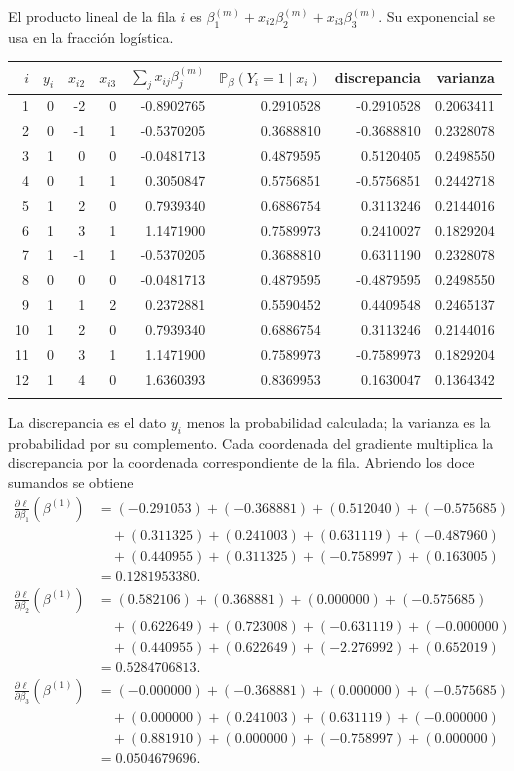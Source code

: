 \documentclass[11pt,a4paper]{article}
\newcommand{\Prob}{\mathbb P}
\begin{document}
El producto lineal de la fila \(i\) es
\(\beta_1^{(m)}+x_{i2}\beta_2^{(m)}+x_{i3}\beta_3^{(m)}\).
Su exponencial se usa en la fracción logística.
\begin{center}\scriptsize
\begin{tabular}{rrrrrrrr}\toprule
\(i\)&\(y_i\)&\(x_{i2}\)&\(x_{i3}\)&\(\sum_jx_{ij}\beta_j^{(m)}\)&\(\Prob_\beta(Y_i=1\mid x_i)\)&discrepancia&varianza\\\midrule
1&0&-2&0&-0.8902765&0.2910528&-0.2910528&0.2063411\\
2&0&-1&1&-0.5370205&0.3688810&-0.3688810&0.2328078\\
3&1&0&0&-0.0481713&0.4879595&0.5120405&0.2498550\\
4&0&1&1&0.3050847&0.5756851&-0.5756851&0.2442718\\
5&1&2&0&0.7939340&0.6886754&0.3113246&0.2144016\\
6&1&3&1&1.1471900&0.7589973&0.2410027&0.1829204\\
7&1&-1&1&-0.5370205&0.3688810&0.6311190&0.2328078\\
8&0&0&0&-0.0481713&0.4879595&-0.4879595&0.2498550\\
9&1&1&2&0.2372881&0.5590452&0.4409548&0.2465137\\
10&1&2&0&0.7939340&0.6886754&0.3113246&0.2144016\\
11&0&3&1&1.1471900&0.7589973&-0.7589973&0.1829204\\
12&1&4&0&1.6360393&0.8369953&0.1630047&0.1364342\\
\\\bottomrule\end{tabular}\end{center}
La discrepancia es el dato \(y_i\) menos la probabilidad
calculada; la varianza es la probabilidad por su complemento.
Cada coordenada del gradiente multiplica la discrepancia por
la coordenada correspondiente de la fila. Abriendo los doce
sumandos se obtiene
\[
\begin{aligned}
\frac{\partial\ell}{\partial\beta_1}(\beta^{(1)})&=(-0.291053)+(-0.368881)+(0.512040)+(-0.575685)\\&\quad+(0.311325)+(0.241003)+(0.631119)+(-0.487960)\\&\quad+(0.440955)+(0.311325)+(-0.758997)+(0.163005)\\&=0.1281953380.\end{aligned}
\]
\[
\begin{aligned}
\frac{\partial\ell}{\partial\beta_2}(\beta^{(1)})&=(0.582106)+(0.368881)+(0.000000)+(-0.575685)\\&\quad+(0.622649)+(0.723008)+(-0.631119)+(-0.000000)\\&\quad+(0.440955)+(0.622649)+(-2.276992)+(0.652019)\\&=0.5284706813.\end{aligned}
\]
\[
\begin{aligned}
\frac{\partial\ell}{\partial\beta_3}(\beta^{(1)})&=(-0.000000)+(-0.368881)+(0.000000)+(-0.575685)\\&\quad+(0.000000)+(0.241003)+(0.631119)+(-0.000000)\\&\quad+(0.881910)+(0.000000)+(-0.758997)+(0.000000)\\&=0.0504679696.\end{aligned}
\]
\end{document}
